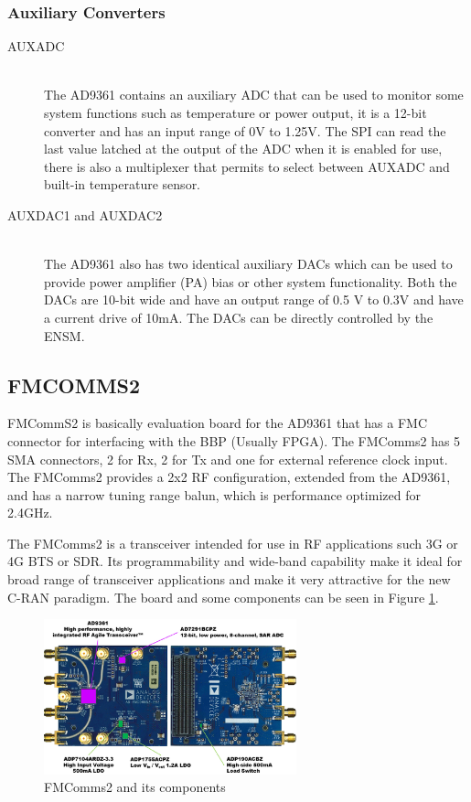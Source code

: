 \subsubsection{Auxiliary Converters}

\begin{description}

	\item[AUXADC] \hfill \\
	The AD9361 contains an auxiliary ADC that can be used to monitor some system
	functions such as temperature or power output, it is a 12-bit converter and has
	an input range of 0V to 1.25V. The SPI can read the last value latched at the
	output of the ADC when it is enabled for use, there is also a multiplexer that
	permits to select between AUXADC and built-in temperature sensor.

	\item[AUXDAC1 and AUXDAC2] \hfill \\
	The AD9361 also has two identical auxiliary DACs which can be used to provide
	power amplifier (PA) bias or other system functionality. Both the DACs are
	10-bit wide and have an output range of 0.5 V to 0.3V and have a current drive
	of 10mA. The DACs can be directly controlled by the ENSM.

\end{description}


\subsection{FMCOMMS2}
\label{trans:fmcomms2}

FMCommS2 is basically evaluation board for the AD9361 that has a FMC connector
for interfacing with the BBP (Usually FPGA). The FMComms2 has 5 SMA connectors,
2 for Rx, 2 for Tx and one for external reference clock input. The FMComms2
provides a 2x2 RF configuration, extended from the AD9361, and has  a narrow
tuning range balun, which is performance optimized for 2.4GHz.

The FMComms2 is a transceiver intended for use in RF applications such 3G or 4G
BTS or SDR. Its programmability and wide-band capability make it ideal for broad
range of transceiver applications and make it very attractive for the new C-RAN
paradigm. The board and some components can be seen in Figure \ref{fig:fmcomm}.

\begin{figure}[htbp]
    \centering
    \includegraphics[width=0.65\textwidth]{./figures/fmcomms2_pic}
    \caption{ FMComms2 and its components
    \label{fig:fmcomm}}
\end{figure}


